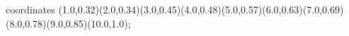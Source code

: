 					coordinates { (1.0,0.32)(2.0,0.34)(3.0,0.45)(4.0,0.48)(5.0,0.57)(6.0,0.63)(7.0,0.69)(8.0,0.78)(9.0,0.85)(10.0,1.0)};